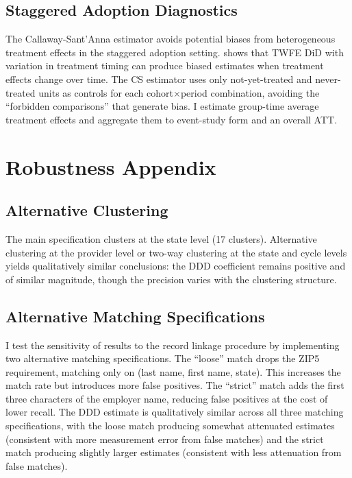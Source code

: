 \documentclass[12pt]{article}
\begin{document}
\subsection{Staggered Adoption Diagnostics}

The Callaway-Sant'Anna estimator avoids potential biases from heterogeneous treatment effects in the staggered adoption setting. \citet{goodmanbacon2021difference} shows that TWFE DiD with variation in treatment timing can produce biased estimates when treatment effects change over time. The CS estimator uses only not-yet-treated and never-treated units as controls for each cohort$\times$period combination, avoiding the ``forbidden comparisons'' that generate bias. I estimate group-time average treatment effects and aggregate them to event-study form and an overall ATT.


\section{Robustness Appendix}\label{app:robustness}

\subsection{Alternative Clustering}

The main specification clusters at the state level (17 clusters). Alternative clustering at the provider level or two-way clustering at the state and cycle levels yields qualitatively similar conclusions: the DDD coefficient remains positive and of similar magnitude, though the precision varies with the clustering structure.

\subsection{Alternative Matching Specifications}

I test the sensitivity of results to the record linkage procedure by implementing two alternative matching specifications. The ``loose'' match drops the ZIP5 requirement, matching only on (last name, first name, state). This increases the match rate but introduces more false positives. The ``strict'' match adds the first three characters of the employer name, reducing false positives at the cost of lower recall. The DDD estimate is qualitatively similar across all three matching specifications, with the loose match producing somewhat attenuated estimates (consistent with more measurement error from false matches) and the strict match producing slightly larger estimates (consistent with less attenuation from false matches).
\end{document}
